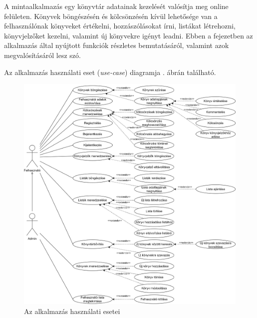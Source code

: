 
A mintaalkalmazás egy könyvtár adatainak kezelését valósítja meg online felületen. Könyvek böngészésén és kölcsönzésén kívül lehetősége van a felhasználónak könyveket értékelni, hozzászólásokat írni, listákat létrehozni, könyvjelzőket kezelni, valamint új könyvekre igényt leadni. Ebben a fejezetben az alkalmazás által nyújtott funkciók részletes bemutatásáról, valamint azok megvalósításáról lesz szó.


Az alkalmazás használati eset (\textit{use-case}) diagramja . ábrán található.

\begin{figure}[h]
	\centering
	\includegraphics[scale=0.6]{images/graphlibrary-usecase-better.png}
	\caption{Az alkalmazás használati esetei}
	\label{fig:use-case}
\end{figure}

